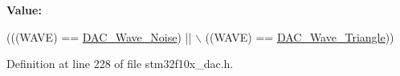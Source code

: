 {\bfseries Value\+:}
\begin{DoxyCode}
(((WAVE) == \hyperlink{group___d_a_c__wave__generation_ga09c5ee68f8e726b1c039df1f6e195965}{DAC\_Wave\_Noise}) || \(\backslash\)
                           ((WAVE) == \hyperlink{group___d_a_c__wave__generation_ga95a1566e1728e1e345e8f3b50629a075}{DAC\_Wave\_Triangle}))
\end{DoxyCode}


Definition at line 228 of file stm32f10x\+\_\+dac.\+h.

